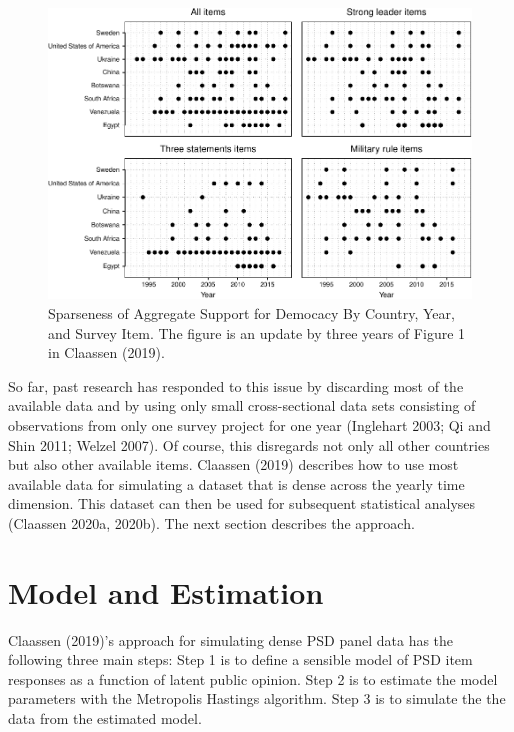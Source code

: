 \documentclass[12pt,english,a4paper,oneside]{article}
\theoremstyle{definition}
\theoremstyle{definition}
\theoremstyle{definition}
\theoremstyle{definition}
\theoremstyle{remark}
\begin{document}
\begin{figure}[H]
\includegraphics[width=\textwidth]{figs/sparse-data-1} \caption[Sparseness of Aggregate Support for Democacy By Country, Year, and Survey Item]{Sparseness of Aggregate Support for Democacy By Country, Year, and Survey Item. The figure is an update by three years of Figure 1 in Claassen (2019).}\label{fig:sparse-data}
\end{figure}

\noindent
So far, past research has responded to this issue by discarding most of the available data and by using only small cross-sectional data sets consisting of observations from only one survey project for one year (Inglehart 2003; Qi and Shin 2011; Welzel 2007). Of course, this disregards not only all other countries but also other available items. Claassen (2019) describes how to use most available data for simulating a dataset that is dense across the yearly time dimension. This dataset can then be used for subsequent statistical analyses (Claassen 2020a, 2020b). The next section describes the approach.

\hypertarget{model-and-estimation}{%
\section{Model and Estimation}\label{model-and-estimation}}

Claassen (2019)'s approach for simulating dense PSD panel data has the following three main steps: Step 1 is to define a sensible model of PSD item responses as a function of latent public opinion. Step 2 is to estimate the model parameters with the Metropolis Hastings algorithm. Step 3 is to simulate the the data from the estimated model.
\end{document}
